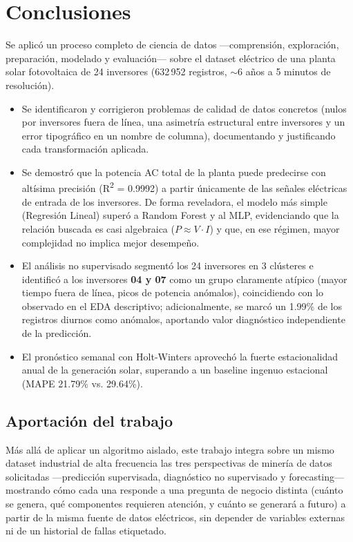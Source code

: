 \section{Conclusiones}
\label{sec:conclusiones}

Se aplicó un proceso completo de ciencia de datos —comprensión, exploración, preparación, modelado y evaluación— sobre el dataset eléctrico de una planta solar fotovoltaica de 24 inversores (632\,952 registros, $\sim$6 años a 5 minutos de resolución).

\begin{itemize}
    \item Se identificaron y corrigieron problemas de calidad de datos concretos (nulos por inversores fuera de línea, una asimetría estructural entre inversores y un error tipográfico en un nombre de columna), documentando y justificando cada transformación aplicada.
    \item Se demostró que la potencia AC total de la planta puede predecirse con altísima precisión (R\textsuperscript{2} = 0.9992) a partir únicamente de las señales eléctricas de entrada de los inversores. De forma reveladora, el modelo más simple (Regresión Lineal) superó a Random Forest y al MLP, evidenciando que la relación buscada es casi algebraica ($P \approx V \cdot I$) y que, en ese régimen, mayor complejidad no implica mejor desempeño.
    \item El análisis no supervisado segmentó los 24 inversores en 3 clústeres e identificó a los inversores \textbf{04 y 07} como un grupo claramente atípico (mayor tiempo fuera de línea, picos de potencia anómalos), coincidiendo con lo observado en el EDA descriptivo; adicionalmente, se marcó un 1.99\% de los registros diurnos como anómalos, aportando valor diagnóstico independiente de la predicción.
    \item El pronóstico semanal con Holt-Winters aprovechó la fuerte estacionalidad anual de la generación solar, superando a un baseline ingenuo estacional (MAPE 21.79\% vs. 29.64\%).
\end{itemize}

\subsection*{Aportación del trabajo}

Más allá de aplicar un algoritmo aislado, este trabajo integra sobre un mismo dataset industrial de alta frecuencia las tres perspectivas de minería de datos solicitadas —predicción supervisada, diagnóstico no supervisado y forecasting— mostrando cómo cada una responde a una pregunta de negocio distinta (cuánto se genera, qué componentes requieren atención, y cuánto se generará a futuro) a partir de la misma fuente de datos eléctricos, sin depender de variables externas ni de un historial de fallas etiquetado.
